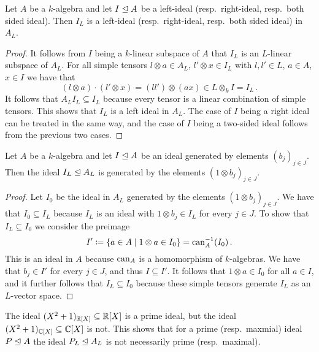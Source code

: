\begin{lemma}
  Let $A$ be a $k$-algebra and let $I \trianglelefteq A$ be a left-ideal (resp.\ right-ideal, resp.\ both sided ideal).
  Then $I_L$ is a left-ideal (resp.\ right-ideal, resp.\ both sided ideal) in $A_L$.
\end{lemma}
\begin{proof}
  It follows from $I$ being a $k$-linear subspace of $A$ that $I_L$ is an $L$-linear subspace of $A_L$.
  For all simple tensors $l \otimes a \in A_L$, $l' \otimes x \in I_L$ with $l, l' \in L$, $a \in A$, $x \in I$ we have that
  \[
        (l \otimes a) \cdot (l' \otimes x)
    =   (l l') \otimes (a x)
    \in L \otimes_k I
    =   I_L \,.
  \]
  It follows that $A_L I_L \subseteq I_L$ because every tensor is a linear combination of simple tensors.
  This shows that $I_L$ is a left ideal in $A_L$.
  The case of $I$ being a right ideal can be treated in the same way, and the case of $I$ being a two-sided ideal follows from the previous two cases.
\end{proof}


\begin{lemma}
  Let $A$ be a $k$-algebra and let $I \trianglelefteq A$ be an ideal generated by elements $(b_j)_{j \in J}$.
  Then the ideal $I_L \trianglelefteq A_L$ is generated by the elements $(1 \otimes b_j)_{j \in J}$.
\end{lemma}
\begin{proof}
  Let $I_0$ be the ideal in $A_L$ generated by the elements $(1 \otimes b_j)_{j \in J}$.
  We have that $I_0 \subseteq I_L$ because $I_L$ is an ideal with $1 \otimes b_j \in I_L$ for every $j \in J$.
  To show that $I_L \subseteq I_0$ we consider the preimage
  \[
              I'
    \coloneqq \{
                a \in A
              \mid
                1 \otimes a \in I_0
              \}
    =         \operatorname{can}_A^{-1}(I_0) \,.
  \]
  This is an ideal in $A$ because $\operatorname{can}_A$ is a homomorphism of $k$-algebras.
  We have that $b_j \in I'$ for every $j \in J$, and thus $I \subseteq I'$.
  It follows that $1 \otimes a \in I_0$ for all $a \in I$, and it further follows that $I_L \subseteq I_0$ because these simple tensors generate $I_L$ as an $L$-vector space.
\end{proof}


\begin{warning}
  The ideal $(X^2+1)_{\mathbb{R}[X]} \subseteq \mathbb{R}[X]$ is a prime ideal, but the ideal \mbox{$(X^2+1)_{\mathbb{C}[X]} \subseteq \mathbb{C}[X]$} is not.
  This shows that for a prime (resp.\ maxmial) ideal $P \trianglelefteq A$ the ideal $P_L \trianglelefteq A_L$ is not necessarily prime (resp.\ maximal).
\end{warning}




